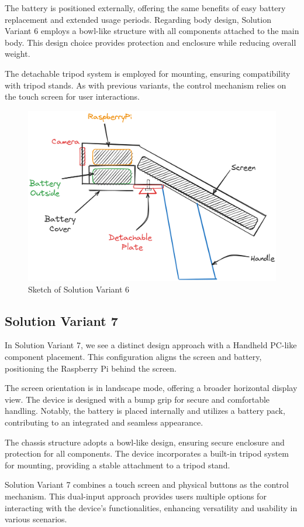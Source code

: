 The battery is positioned externally, offering the same benefits of easy battery replacement and extended usage periods. Regarding body design, Solution Variant 6 employs a bowl-like structure with all components attached to the main body. This design choice provides protection and enclosure while reducing overall weight.

The detachable tripod system is employed for mounting, ensuring compatibility with tripod stands. As with previous variants, the control mechanism relies on the touch screen for user interactions.

\begin{figure}[H]
    \centering
    \includegraphics[width=0.5\linewidth]{texs/Part1/chapter3/image/v6.png}
    \caption{Sketch of Solution Variant 6}
    \label{fig:sketch-solution-variant-6}
\end{figure}

\subsection{Solution Variant 7}
In Solution Variant 7, we see a distinct design approach with a Handheld PC-like component placement. This configuration aligns the screen and battery, positioning the Raspberry Pi behind the screen.

The screen orientation is in landscape mode, offering a broader horizontal display view. The device is designed with a bump grip for secure and comfortable handling. Notably, the battery is placed internally and utilizes a battery pack, contributing to an integrated and seamless appearance.

The chassis structure adopts a bowl-like design, ensuring secure enclosure and protection for all components. The device incorporates a built-in tripod system for mounting, providing a stable attachment to a tripod stand.

Solution Variant 7 combines a touch screen and physical buttons as the control mechanism. This dual-input approach provides users multiple options for interacting with the device's functionalities, enhancing versatility and usability in various scenarios.

